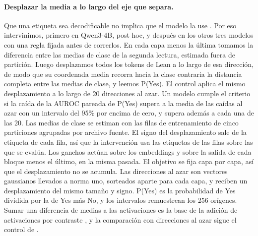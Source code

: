 \documentclass[10pt]{article}
\begin{document}
\paragraph{Desplazar la media a lo largo del eje que separa.} Que una etiqueta sea decodificable no implica que el
modelo la use \citep{elazar2021amnesic}. Por eso intervinimos, primero en Qwen3-4B, post hoc, y después en los otros tres modelos con una regla fijada antes de correrlos. En cada capa menos la última tomamos la
diferencia entre las medias de clase de la segunda lectura, estimada fuera de partición. Luego desplazamos todos los
tokens de Lean a lo largo de esa dirección, de modo que su coordenada media recorra hacia la clase contraria la
distancia completa entre las medias de clase, y leemos P(Yes). El control aplica el mismo desplazamiento a lo largo de
20 direcciones al azar. Un modelo cumple el criterio si la caída de la AUROC pareada de P(Yes) supera a la media de
las caídas al azar con un intervalo del 95\% por encima de cero, y supera además a cada una de las 20. Las medias de
clase se estiman con las filas de entrenamiento de cinco particiones agrupadas por archivo fuente. El signo del
desplazamiento sale de la etiqueta de cada fila, así que la intervención usa las etiquetas de las filas sobre las que
se evalúa. Los ganchos actúan sobre los embeddings y sobre la salida de cada bloque menos el último, en la misma
pasada. El objetivo se fija capa por capa, así que el desplazamiento no se acumula. Las direcciones al azar son
vectores gaussianos llevados a norma uno, sorteados aparte para cada capa, y reciben un desplazamiento del mismo
tamaño y signo. P(Yes) es la probabilidad de Yes dividida por la de Yes más No, y los intervalos remuestrean los 256
orígenes. Sumar una diferencia de medias a las activaciones es la base de la adición de activaciones por contraste
\citep{rimsky2024steering}, y la comparación con direcciones al azar sigue el control de \citet{elazar2021amnesic}.
\end{document}
